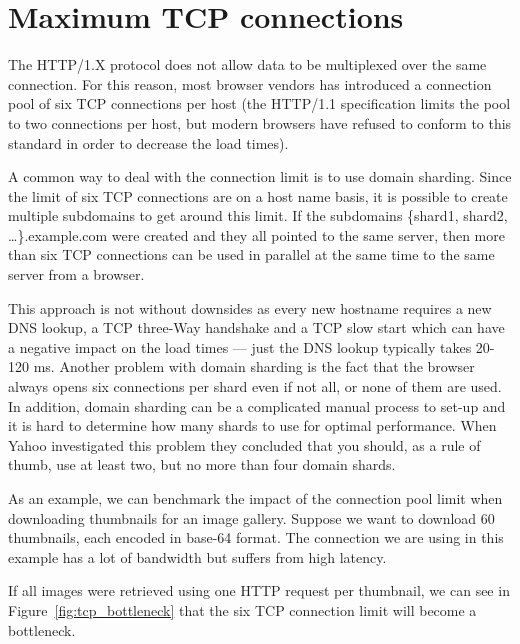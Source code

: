 \documentclass{cslthse-msc}
\begin{document}
\section{Maximum TCP connections}
\label{max_tcp}
The HTTP/1.X protocol does not allow data to be multiplexed over the same connection\cite[p.194]{HPBN}. For this reason, most browser vendors has introduced a connection pool of six TCP connections per host (the HTTP/1.1 specification limits the pool to two connections\cite{rfc2616} per host, but modern browsers have refused to conform to this standard in order to decrease the load times).

A common way to deal with the connection limit is to use domain sharding. Since the limit of six TCP connections are on a host name basis, it is possible to create multiple subdomains to get around this limit. If the subdomains \{shard1, shard2, \ldots\}.example.com were created and they all pointed to the same server, then more than six TCP connections can be used in parallel at the same time to the same server from a browser. 

This approach is not without downsides as every new hostname requires a new DNS lookup, a TCP three-Way handshake and a TCP slow start which can have a negative impact on the load times\cite[page 199]{HPBN} --- just the DNS lookup typically takes 20-120 ms\cite[page 63]{HPWS}. Another problem with domain sharding is the fact that the browser always opens six connections per shard even if not all, or none of them are used. In addition, domain sharding can be a complicated manual process to set-up and it is hard to determine how many shards to use for optimal performance. When Yahoo investigated this problem they concluded that you should, as a rule of thumb, use at least two, but no more than four domain shards\cite{yahoo-performance-4}.

As an example, we can benchmark the impact of the connection pool limit when downloading thumbnails for an image gallery. Suppose we want to download 60 thumbnails, each encoded in base-64 format. The connection we are using in this example has a lot of bandwidth but suffers from high latency.

If all images were retrieved using one HTTP request per thumbnail, we can see in Figure~\ref{fig:tcp_bottleneck} that the six TCP connection limit will become a bottleneck.
\end{document}
